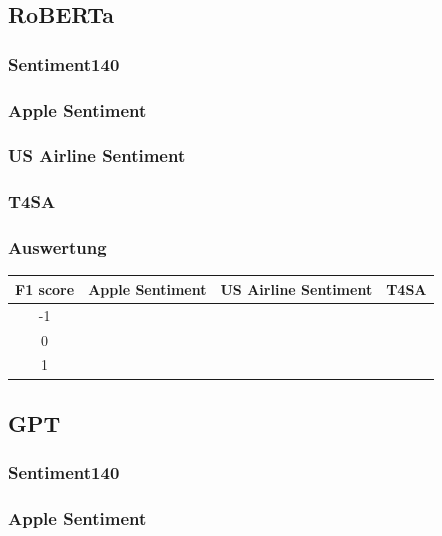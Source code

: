 \subsection{RoBERTa}

\subsubsection*{Sentiment140}

\subsubsection*{Apple Sentiment}

\subsubsection*{US Airline Sentiment}

\subsubsection*{T4SA}

\subsubsection*{Auswertung}
\begin{center}
\begin{tabular}{|c||c|c|c|}
\hline
F1 score & Apple Sentiment & US Airline Sentiment & T4SA\\ 
\hline\hline
-1 &  &  & \\
\hline
0 &  &  & \\ 
\hline
1 &  &  & \\
\hline    
\end{tabular}
\end{center}

\subsection{GPT}

\subsubsection*{Sentiment140}

\subsubsection*{Apple Sentiment}

